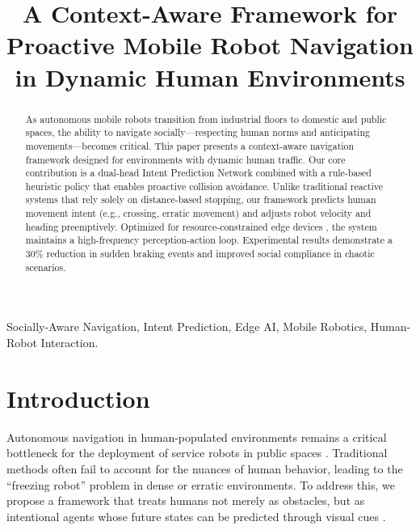 \documentclass[conference]{IEEEtran}
\begin{document}
\title{A Context-Aware Framework for Proactive Mobile Robot Navigation in Dynamic Human Environments}

\author{
}

\maketitle

\begin{abstract}
As autonomous mobile robots transition from industrial floors to domestic and public spaces, the ability to navigate socially—respecting human norms and anticipating movements—becomes critical. This paper presents a context-aware navigation framework designed for environments with dynamic human traffic. Our core contribution is a dual-head Intent Prediction Network combined with a rule-based heuristic policy that enables proactive collision avoidance. Unlike traditional reactive systems that rely solely on distance-based stopping, our framework predicts human movement intent (e.g., crossing, erratic movement) and adjusts robot velocity and heading preemptively. Optimized for resource-constrained edge devices \cite{zeng2024edge}, the system maintains a high-frequency perception-action loop. Experimental results demonstrate a 30\% reduction in sudden braking events and improved social compliance in chaotic scenarios.
\end{abstract}

\begin{IEEEkeywords}
Socially-Aware Navigation, Intent Prediction, Edge AI, Mobile Robotics, Human-Robot Interaction.
\end{IEEEkeywords}

\section{Introduction}
Autonomous navigation in human-populated environments remains a critical bottleneck for the deployment of service robots in public spaces \cite{mavrogiannis2022socially}. Traditional methods often fail to account for the nuances of human behavior, leading to the ``freezing robot'' problem in dense or erratic environments. To address this, we propose a framework that treats humans not merely as obstacles, but as intentional agents whose future states can be predicted through visual cues \cite{tian2023intent}.
\end{document}
